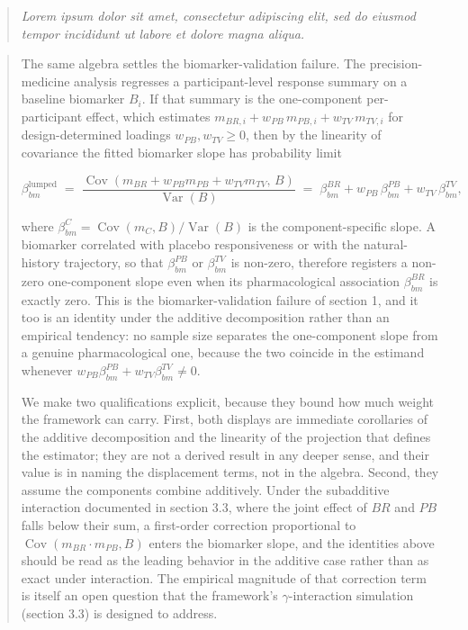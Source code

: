 \documentclass[
  11pt,
]{article}
\newenvironment{rgt}{%
  \begin{quote}\small\itshape\color[RGB]{20,60,160}}{%
  \end{quote}}
\newenvironment{orig}{%
  \begin{quote}\normalsize\color[gray]{0.55}}{%
  \end{quote}}
\begin{document}
\begin{rgt}
Lorem ipsum dolor sit amet, consectetur adipiscing elit, sed do eiusmod tempor incididunt ut labore et dolore magna aliqua.

\end{rgt}

\begin{orig}
The same algebra settles the biomarker-validation failure. The
precision-medicine analysis regresses a participant-level response
summary on a baseline biomarker \(B_i\). If that summary is the
one-component per-participant effect, which estimates
\(m_{BR,i} + w_{PB}\,m_{PB,i} + w_{TV}\,m_{TV,i}\) for
design-determined loadings \(w_{PB}, w_{TV} \ge 0\), then by the
linearity of covariance the fitted biomarker slope has probability
limit

\[
\beta_{bm}^{\text{lumped}}
\;=\; \frac{\operatorname{Cov}(m_{BR} + w_{PB} m_{PB} +
  w_{TV} m_{TV},\, B)}{\operatorname{Var}(B)}
\;=\; \beta_{bm}^{BR} + w_{PB}\,\beta_{bm}^{PB} +
  w_{TV}\,\beta_{bm}^{TV},
\]

where \(\beta_{bm}^{C} = \operatorname{Cov}(m_C, B) /
\operatorname{Var}(B)\) is the component-specific slope. A biomarker
correlated with placebo responsiveness or with the natural-history
trajectory, so that \(\beta_{bm}^{PB}\) or \(\beta_{bm}^{TV}\) is
non-zero, therefore registers a non-zero one-component slope even when its
pharmacological association \(\beta_{bm}^{BR}\) is exactly zero. This
is the biomarker-validation failure of section 1, and it too is an
identity under the additive decomposition rather than an empirical
tendency: no sample size separates the one-component slope from a genuine
pharmacological one, because the two coincide in the estimand
whenever \(w_{PB}\beta_{bm}^{PB} + w_{TV}\beta_{bm}^{TV} \ne 0\).

We make two qualifications explicit, because they bound how much
weight the framework can carry. First, both displays are immediate
corollaries of the additive decomposition and the linearity of the
projection that defines the estimator; they are not a derived result
in any deeper sense, and their value is in naming the displacement
terms, not in the algebra. Second, they assume the components combine
additively. Under the subadditive interaction documented in section
3.3, where the joint effect of \(BR\) and \(PB\) falls below their sum, a
first-order correction proportional to \(\operatorname{Cov}(m_{BR}\cdot
m_{PB}, B)\) enters the biomarker slope, and the identities above
should be read as the leading behavior in the additive case rather
than as exact under interaction. The empirical magnitude of that
correction term is itself an open question that the framework's
\(\gamma\)-interaction simulation (section 3.3) is designed to address.

\end{orig}
\end{document}
